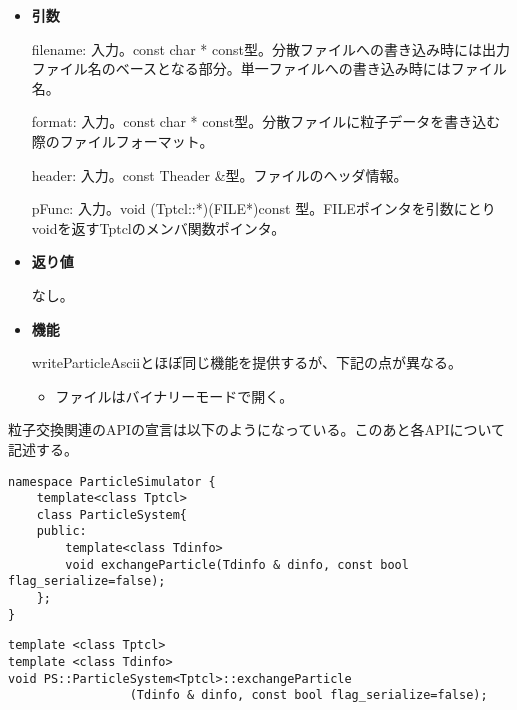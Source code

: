 \begin{itemize}

\item{{\bf 引数}}

  filename: 入力。const char * const型。分散ファイルへの書き込み時には出力ファイル名のベースとなる部分。単一ファイルへの書き込み時にはファイル名。

  format: 入力。const char * const型。分散ファイルに粒子データを書き込む際のファイルフォーマット。

  header: 入力。const Theader \&型。ファイルのヘッダ情報。
  
  pFunc: 入力。void (Tptcl::*)(FILE*)const 型。FILEポインタを引数にとりvoidを返すTptclのメンバ関数ポインタ。


\item{{\bf 返り値}}

  なし。

\item{{\bf 機能}}

writeParticleAsciiとほぼ同じ機能を提供するが、下記の点が異なる。
\begin{itemize}
\item ファイルはバイナリーモードで開く。
\end{itemize}

\end{itemize}




粒子交換関連のAPIの宣言は以下のようになっている。このあと各APIについて
記述する。
\begin{lstlisting}[caption=ParticleSystem4]
namespace ParticleSimulator {
    template<class Tptcl>
    class ParticleSystem{
    public:
        template<class Tdinfo>
        void exchangeParticle(Tdinfo & dinfo, const bool flag_serialize=false);
    };
}
\end{lstlisting}

\label{sec:particleSystem:exchangeParticle}

\begin{screen}
\begin{verbatim}
template <class Tptcl>
template <class Tdinfo>
void PS::ParticleSystem<Tptcl>::exchangeParticle
                 (Tdinfo & dinfo, const bool flag_serialize=false);
\end{verbatim}
\end{screen}

